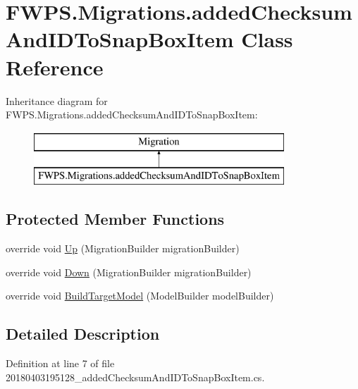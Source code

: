 \hypertarget{class_f_w_p_s_1_1_migrations_1_1added_checksum_and_i_d_to_snap_box_item}{}\section{F\+W\+P\+S.\+Migrations.\+added\+Checksum\+And\+I\+D\+To\+Snap\+Box\+Item Class Reference}
\label{class_f_w_p_s_1_1_migrations_1_1added_checksum_and_i_d_to_snap_box_item}
Inheritance diagram for F\+W\+P\+S.\+Migrations.\+added\+Checksum\+And\+I\+D\+To\+Snap\+Box\+Item\+:\begin{figure}[H]
\begin{center}
\leavevmode
\includegraphics[height=2.000000cm]{class_f_w_p_s_1_1_migrations_1_1added_checksum_and_i_d_to_snap_box_item}
\end{center}
\end{figure}
\subsection*{Protected Member Functions}
\begin{DoxyCompactItemize}
\item 
override void \mbox{\hyperlink{class_f_w_p_s_1_1_migrations_1_1added_checksum_and_i_d_to_snap_box_item_a4f36fdeede63b08618eccad7ba4fa019}{Up}} (Migration\+Builder migration\+Builder)
\item 
override void \mbox{\hyperlink{class_f_w_p_s_1_1_migrations_1_1added_checksum_and_i_d_to_snap_box_item_a7312070c5a8ff2b1794b39b5944ff209}{Down}} (Migration\+Builder migration\+Builder)
\item 
override void \mbox{\hyperlink{class_f_w_p_s_1_1_migrations_1_1added_checksum_and_i_d_to_snap_box_item_a556a6f9cbf0020afcac5574af5fccc03}{Build\+Target\+Model}} (Model\+Builder model\+Builder)
\end{DoxyCompactItemize}


\subsection{Detailed Description}


Definition at line 7 of file 20180403195128\+\_\+added\+Checksum\+And\+I\+D\+To\+Snap\+Box\+Item.\+cs.



